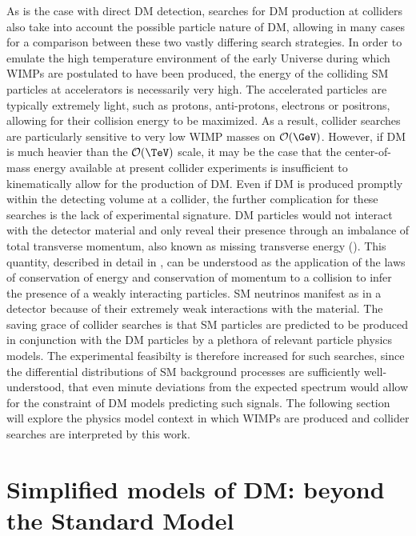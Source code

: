 As is the case with direct DM detection, searches for DM production at colliders also take into account the possible particle nature of DM, allowing in many cases for a comparison between these two vastly differing search strategies. In order to emulate the high temperature environment of the early Universe during which WIMPs are postulated to have been produced, the energy of the colliding SM particles at accelerators is necessarily very high. The accelerated particles are typically extremely light, such as protons, anti-protons, electrons or positrons, allowing for their collision energy to be maximized. As a result, collider searches are particularly sensitive to very low WIMP masses on $\mathcal{O}(\GeV)$. However, if DM is much heavier than the $\mathcal{O}(\TeV)$ scale, it may be the case that the center-of-mass energy available at present collider experiments is insufficient to kinematically allow for the production of DM. Even if DM is produced promptly within the detecting volume at a collider, the further complication for these searches is the lack of experimental signature. DM particles would not interact with the detector material and only reveal their presence through an imbalance of total transverse momentum, also known as missing transverse energy (\MET). This quantity, described in detail in , can be understood as the application of the laws of conservation of energy and conservation of momentum to a collision to infer the presence of a weakly interacting particles. SM neutrinos manifest as \MET in a detector because of their extremely weak interactions with the material. The saving grace of collider searches is that SM particles are predicted to be produced in conjunction with the DM particles by a plethora of relevant particle physics models. The experimental feasibilty is therefore increased for such searches, since the differential distributions of SM background processes are sufficiently well-understood, that even minute deviations from the expected \MET spectrum would allow for the constraint of DM models predicting such signals. The following section will explore the physics model context in which WIMPs are produced and collider searches are interpreted by this work.

\section{Simplified models of DM: beyond the Standard Model}
\label{sec:BSM}


